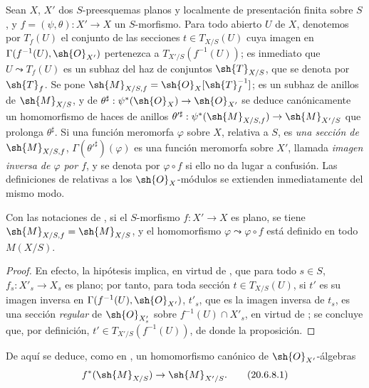 \begin{env}[20.6.7]
\label{IV.20.6.7}
Sean $X$, $X'$ dos $S$-preesquemas planos y localmente de presentación finita sobre $S$, y $f=(\psi,\theta):X'\to X$ un $S$-morfismo.
Para todo abierto $U$ de $X$, denotemos por $T_f(U)$ el conjunto de las secciones $t\in T_{X/S}(U)$ cuya imagen en $\Gamma(f^{-1}(U),\sh{O}_{X'})$ pertenezca a $T_{X'/S}(f^{-1}(U))$; es inmediato que $U\leadsto T_f(U)$ es un subhaz del haz de conjuntos $\sh{T}_{X/S}$, que se denota por $\sh{T}_f$.
Se pone $\sh{M}_{X/S,f}=\sh{O}_X[\sh{T}_f^{-1}]$; es un subhaz de anillos de $\sh{M}_{X/S}$, y de $\theta^\sharp: \psi^*(\sh{O}_X)\to\sh{O}_{X'}$ se deduce canónicamente un homomorfismo de haces de anillos $\theta'^\sharp: \psi^*(\sh{M}_{X/S,f})\to\sh{M}_{X'/S}$ que prolonga $\theta^\sharp$.
Si una función meromorfa $\varphi$ sobre $X$, relativa a $S$, es \emph{una sección de $\sh{M}_{X/S,f}$}, $\Gamma(\theta'^\sharp)(\varphi)$ es una función meromorfa sobre $X'$, llamada \emph{imagen inversa de $\varphi$ por $f$}, y se denota por $\varphi\circ f$ si ello no da lugar a confusión.
Las definiciones de  relativas a los $\sh{O}_X$-módulos se extienden inmediatamente del mismo modo.
\end{env}

\begin{proposition}[20.6.8]
\label{IV.20.6.8}
Con las notaciones de , si el $S$-morfismo $f:X'\to X$ es plano, se tiene $\sh{M}_{X/S,f}=\sh{M}_{X/S}$, y el homomorfismo $\varphi\leadsto\varphi\circ f$ está definido en todo $M(X/S)$.
\end{proposition}

\begin{proof}
En efecto, la hipótesis implica, en virtud de , que para todo $s\in S$, $f_s:X'_s\to X_s$ es plano; por tanto, para toda sección $t\in T_{X/S}(U)$, si $t'$ es su imagen inversa en $\Gamma(f^{-1}(U),\sh{O}_{X'})$, $t'_{s}$, que es la imagen inversa de $t_s$, es una sección \emph{regular} de $\sh{O}_{X'_s}$ sobre $f^{-1}(U)\cap X'_s$, en virtud de ; se concluye que, por definición, $t'\in T_{X'/S}(f^{-1}(U))$, de donde la proposición.
\end{proof}

De aquí se deduce, como en , un homomorfismo canónico de $\sh{O}_{X'}$-álgebras
\[
\label{IV.20.6.8.1}
  f^*(\sh{M}_{X/S})\to\sh{M}_{X'/S}.
  \tag{20.6.8.1}
\]

